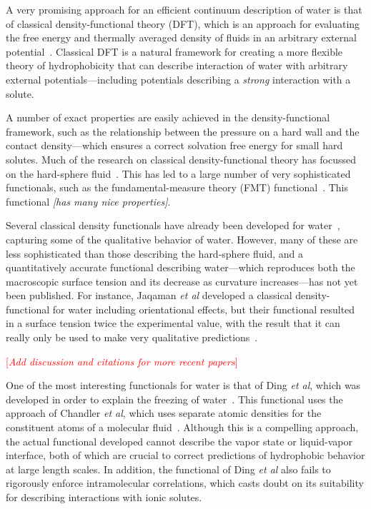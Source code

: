 \documentclass[letterpaper,twocolumn,amsmath,amssymb,prb]{revtex4}
\newcommand{\needsworklater}[1]{\emph{[#1]}}
\newcommand{\needsworknow}[1]{\textcolor{red}{[\emph{#1}]}}
\begin{document}
A very promising approach for an efficient continuum description of water
is that of classical density-functional theory (DFT), which is an approach
for evaluating the free energy and thermally averaged density of fluids in
an arbitrary external potential~\cite{ebner1976}.  Classical DFT is a
natural framework for creating a more flexible theory of hydrophobicity
that can describe interaction of water with arbitrary external
potentials---including potentials describing a \emph{strong} interaction
with a solute.

A number of exact properties are easily achieved in the density-functional
framework, such as the relationship between the pressure on a hard wall and
the contact density---which ensures a correct solvation free energy for
small hard solutes.  Much of the research on classical density-functional
theory has focussed on the hard-sphere fluid~\cite{curtin1985,
rosenfeld1989, rosenfeld1993, rosenfeld1997, tarazona1997, tarazona2000}.
This has led to a large number of very sophisticated functionals, such as
the fundamental-measure theory (FMT) functional~\cite{rosenfeld1989,
rosenfeld1993, rosenfeld1997, tarazona1997, tarazona2000}.  This functional
\needsworklater{has many nice properties}.

Several classical density functionals have already been developed for
water~\cite{ding1987, Yang1992, Jaqaman2004}, capturing some of the
qualitative behavior of water.  However, many of these are less
sophisticated than those describing the hard-sphere fluid, and a
quantitatively accurate functional describing water---which reproduces both
the macroscopic surface tension and its decrease as curvature
increases---has not yet been published.  For instance, Jaqaman \emph{et al}
developed a classical density-functional for water including orientational
effects, but their functional resulted in a surface tension twice the
experimental value, with the result that it can really only be used to make
very qualitative predictions~\cite{Jaqaman2004}.

\needsworknow{Add discussion and citations for more recent papers}

One of the most interesting functionals for water is that of Ding \emph{et
al}, which was developed in order to explain the freezing of
water~\cite{ding1987}.  This functional uses the approach of Chandler
\emph{et al}, which uses separate atomic densities for the constituent
atoms of a molecular fluid~\cite{chandler1986a, chandler1986b}.  Although
this is a compelling approach, the actual functional developed cannot
describe the vapor state or liquid-vapor interface, both of which are
crucial to correct predictions of hydrophobic behavior at large length
scales.  In addition, the functional of Ding \emph{et al} also fails to
rigorously enforce intramolecular correlations, which casts doubt on its
suitability for describing interactions with ionic solutes.
\end{document}
